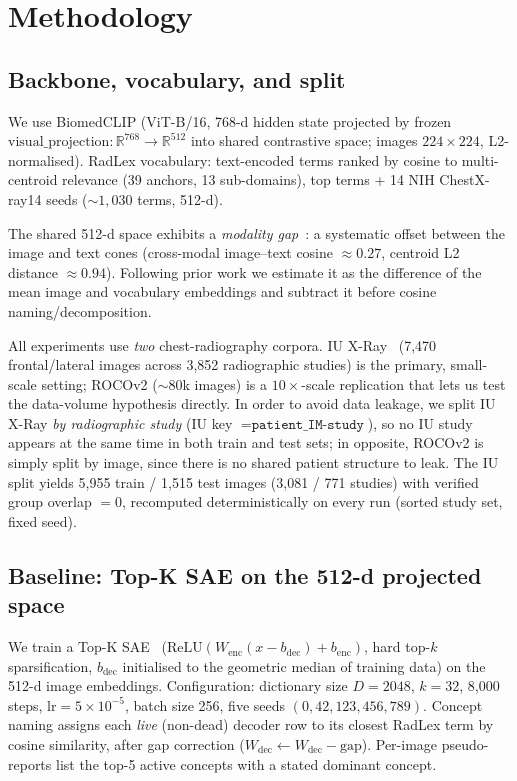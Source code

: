 \documentclass[sigconf, nonacm]{acmart}
\begin{document}
\section{Methodology}
\subsection{Backbone, vocabulary, and split}
We use BiomedCLIP (ViT-B/16, 768-d hidden state projected by frozen $\mathrm{visual\_projection}: \mathbb{R}^{768}\!\to\!\mathbb{R}^{512}$ into shared contrastive space; images $224{\times}224$, L2-normalised). RadLex vocabulary: text-encoded terms ranked by cosine to multi-centroid relevance (39 anchors, 13 sub-domains), top terms + 14 NIH ChestX-ray14 seeds (${\sim}1{,}030$ terms, 512-d).

The shared 512-d space exhibits a \emph{modality gap}~\cite{liang2022mindthegap}: a systematic offset between the image and text cones (cross-modal image--text cosine ${\approx}0.27$, centroid L2 distance ${\approx}0.94$). Following prior work we estimate it as the difference of the mean image and vocabulary embeddings and subtract it before cosine naming/decomposition.

All experiments use \emph{two} chest-radiography corpora. IU X-Ray~\cite{demner2016iuxray} (7,470 frontal/lateral images across 3,852 radiographic studies) is the primary, small-scale setting; ROCOv2 (${\sim}80$k images) is a $10{\times}$-scale replication that lets us test the data-volume hypothesis directly.  In order to avoid data leakage, we split IU X-Ray \emph{by radiographic study} (IU key $=\texttt{patient\_IM-study}$), so no IU study appears at the same time in both train and test sets; in opposite, ROCOv2 is simply split by image, since there is no shared patient structure to leak. The IU split yields 5,955 train / 1,515 test images (3,081 / 771 studies) with verified group overlap $=0$, recomputed deterministically on every run (sorted study set, fixed seed).

\subsection{Baseline: Top-K SAE on the 512-d projected space}
We train a Top-K SAE~\cite{gao2024scaling} ($\mathrm{ReLU}(W_{\mathrm{enc}}(x-b_{\mathrm{dec}})+b_{\mathrm{enc}})$, hard top-$k$ sparsification, $b_{\mathrm{dec}}$ initialised to the geometric median of training data) on the 512-d image embeddings. Configuration: dictionary size $D{=}2048$, $k{=}32$, 8,000 steps, $\mathrm{lr}{=}5{\times}10^{-5}$, batch size 256, five seeds $(0,42,123,456,789)$. Concept naming assigns each \emph{live} (non-dead) decoder row to its closest RadLex term by cosine similarity, after gap correction ($W_{\mathrm{dec}}\!\leftarrow\!W_{\mathrm{dec}}-\mathrm{gap}$). Per-image pseudo-reports list the top-5 active concepts with a stated dominant concept.
\end{document}
